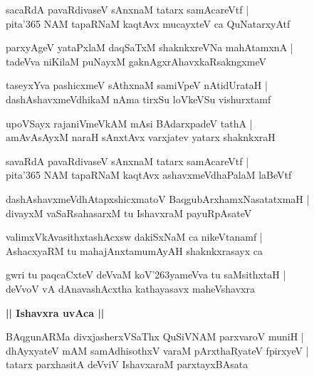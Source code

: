 \documentclass[twoside,12pt,openright]{book}
\def\S{\char'263}
\newcounter{shloka}[chapter]
\def\uvaca#1{\centerline{{\large\textbf{#1}}}}
\begin{document}
\begin{shloka}
sacaRdA pavaRdivaseV sAnxnaM tatarx samAcareVtf |\\
pita\char'365 NAM tapaRNaM kaqtAvx mucayxteV ca QuNatarxyAtf 
\end{shloka}

\begin{shloka}
parxyAgeV yataPxlaM daqSaTxM shaknkxreVNa mahAtamxnA |\\
tadeVva niKilaM puNayxM gaknAgxrAhavxkaRsakngxmeV 
\end{shloka}

\begin{shloka}
taseyxYva pashicxmeV sAthxnaM samiVpeV nAtidUrataH |\\
dashAshavxmeVdhikaM nAma tirxSu loVkeVSu vishurxtamf 
\end{shloka}

\begin{shloka}
upoVSayx rajaniVmeVkAM mAsi BAdarxpadeV tathA |\\
amAvAsAyxM naraH sAnxtAvx varxjatev yatarx shaknkxraH 
\end{shloka}

\begin{shloka}
savaRdA pavaRdivaseV sAnxnaM tatarx samAcareVtf |\\
pita\char'365 NAM tapaRNaM kaqtAvx ashavxmeVdhaPalaM laBeVtf
\end{shloka}

\begin{shloka}
dashAshavxmeVdhAtapxshicxmatoV BaqgubArxhamxNasatatxmaH |\\
divayxM vaSaRsahasarxM tu IshavxraM payuRpAsateV 
\end{shloka}

\begin{shloka}
valimxVkAvasithxtashAcxsw dakiSxNaM ca nikeVtanamf |\\
AshacxyaRM tu mahajAnxtamumAyAH shaknkxrasayx ca 
\end{shloka}

\begin{shloka}
gwri tu paqcaCxteV deVvaM koV\S yameVva tu saMsithxtaH |\\
deVvoV vA dAnavashAcxtha kathayasavx maheVshavxra
\end{shloka}

\uvaca{|| Ishavxra uvAca ||}

\begin{shloka}
BAqgunARMa divxjasherxVSaThx QuSiVNAM parxvaroV muniH |\\
dhAyxyateV mAM samAdhisothxV varaM pArxthaRyateV fpirxyeV |\\
tatarx parxhasitA deVviV IshavxaraM parxtayxBAsata
\end{shloka}
\end{document}
